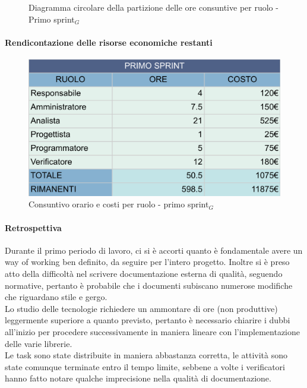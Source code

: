 \documentclass[10pt]{article}
\begin{document}
{{    \begin{figure}[H]
        \centering
        \caption{Diagramma circolare della partizione delle ore consuntive per ruolo - Primo sprint$_G$ }
        \label{fig:Diagramma circolare della partizione delle ore consuntive per ruolo - primo sprint$_G$}
    \end{figure}



    \paragraph{Rendicontazione delle risorse economiche restanti}\mbox{}\vspace{0.4em}

    
    \begin{figure}[ht]
    	\centering
    	\includegraphics[width=0.6\linewidth]{oreCostiPrimoSprint.png}
    	\caption{Consuntivo orario e costi per ruolo - primo sprint$_G$}
    	\label{fig:Consuntivo orario e costi per ruolo - primo sprint$_G$}
    \end{figure}


    \paragraph{Retrospettiva}\mbox{}\vspace{0.4em}

    Durante il primo periodo di lavoro, ci si è accorti quanto è fondamentale avere un way of working ben definito, da seguire per l'intero progetto. Inoltre si è preso atto della difficoltà nel scrivere documentazione esterna di qualità, seguendo normative, pertanto è probabile che i documenti subiscano numerose modifiche che riguardano stile e gergo.\\ Lo studio delle tecnologie richiedere un ammontare di ore (non produttive) leggermente superiore a quanto previsto, pertanto è necessario chiarire i dubbi all'inizio per procedere successivamente in maniera lineare con l'implementazione delle varie librerie.\\Le task sono state distribuite in maniera abbastanza corretta, le attività sono state comunque terminate entro il tempo limite, sebbene a volte i verificatori hanno fatto notare qualche imprecisione nella qualità di documentazione.

}}
\end{document}
